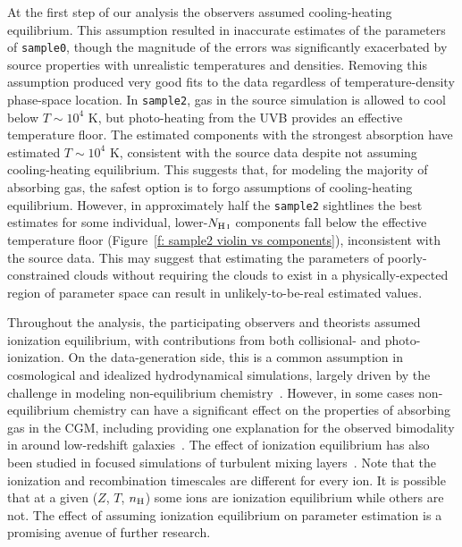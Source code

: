 \documentclass[fleqn,usenatbib]{mnras}
\begin{document}
At the first step of our analysis the observers assumed cooling-heating equilibrium.
This assumption resulted in inaccurate estimates of the parameters of \texttt{sample0}, though the magnitude of the errors was significantly exacerbated by source properties with unrealistic temperatures and densities.
Removing this assumption produced very good fits to the data regardless of temperature-density phase-space location.
In \texttt{sample2}, gas in the source simulation is allowed to cool below $T \sim 10^4$ K,
but photo-heating from the UVB provides an effective temperature floor.
The estimated components with the strongest absorption have estimated $T \sim 10^4$ K,
consistent with the source data despite not assuming cooling-heating equilibrium.
This suggests that, for modeling the majority of absorbing gas, the safest option is to forgo assumptions of cooling-heating equilibrium.
However, in approximately half the \texttt{sample2} sightlines the best estimates for some individual, lower-$N_{\ion{H}{I}}$ components fall below the effective temperature floor (Figure~\ref{f: sample2 violin vs components}),
inconsistent with the source data.
This may suggest that estimating the parameters of poorly-constrained clouds without requiring the clouds to exist in a physically-expected region of parameter space can result in unlikely-to-be-real estimated values.

Throughout the analysis, the participating observers and theorists assumed ionization equilibrium, with contributions from both collisional- and photo-ionization.
On the data-generation side, this is a common assumption in cosmological and idealized hydrodynamical simulations, largely driven by the challenge in modeling non-equilibrium chemistry~\citep[e.g.][]{richings2014Nonequilibrium}.
However, in some cases non-equilibrium chemistry can have a significant effect on the properties of absorbing gas in the CGM, including providing one explanation for the observed bimodality in  around low-redshift galaxies~\citep{oppenheimer2016Bimodality}.
The effect of ionization equilibrium has also been studied in focused simulations of turbulent mixing layers~\citep[e.g.][]{ji2019Simulations}.
Note that the ionization and recombination timescales are different for every ion.
It is possible that at a given ($Z$, $T$, $n_{\rm H}$) some ions are ionization equilibrium while others are not.
The effect of assuming ionization equilibrium on parameter estimation is a promising avenue of further research.
\end{document}
